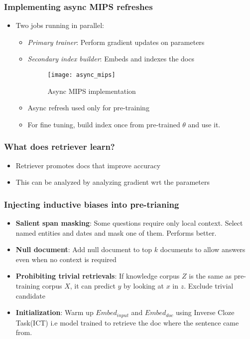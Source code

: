 \documentclass[a4paper]{article}
\begin{document}
\subsubsection{Implementing async MIPS refreshes}
\begin{itemize}
    \item Two jobs running in parallel:
    \begin{itemize}
        \item \textit{Primary trainer}: Perform gradient updates on parameters
        \item \textit{Secondary index builder}: Embeds and indexes the docs
        \begin{figure}[H]
            \centering
            \texttt{[image: async\_mips]}
            \caption{Async MIPS implementation}
            \label{fig:async_mips}
        \end{figure}
        \item Async refresh used only for pre-training
        \item For fine tuning, build index once from pre-trained $\theta$ and use it.
    \end{itemize}
\end{itemize}
\subsubsection{What does retriever learn?}
\begin{itemize}
    \item Retriever promotes docs that improve accuracy
    \item This can be analyzed by analyzing gradient wrt the parameters
\end{itemize}
\subsubsection{Injecting inductive biases into pre-trianing}
\begin{itemize}
    \item \textbf{Salient span masking}: Some questions require only local context. Select named entities and dates and mask one of them. Performs better. 
    \item \textbf{Null document}: Add null document to top $k$ documents to allow answers even when no context is required 
    \item \textbf{Prohibiting trivial retrievals}: If knowledge corpus $Z$ is the same as pre-training corpus $X$, it can predict $y$ by looking at $x$ in $z$. Exclude trivial candidate
    \item \textbf{Initialization}: Warm up $Embed_{input}$ and $Embed_{doc}$ using Inverse Cloze Task(ICT) i.e model trained to retrieve the doc where the sentence came from.  
\end{itemize}
\end{document}
